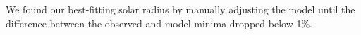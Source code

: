 We found our best-fitting solar radius by manually adjusting the model until the difference between the observed and model minima dropped below 1\%.
